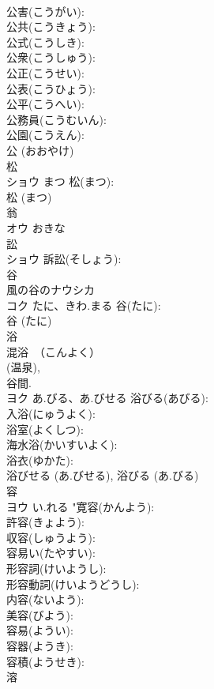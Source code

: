 \documentclass[8pt]{extreport}
\begin{document}
\begin{CJK}{UTF8}{min}
\\	公害(こうがい): 
\\	公共(こうきょう): 
\\	公式(こうしき): 
\\	公衆(こうしゅう): 
\\	公正(こうせい): 
\\	公表(こうひょう): 
\\	公平(こうへい): 
\\	公務員(こうむいん): 
\\	公園(こうえん): 
\\	公 (おおやけ)
\\	松			
\\	ショウ	まつ	松(まつ): 
\\	松 (まつ)
\\	翁			
\\	オウ	おきな		
\\	訟			
\\	ショウ		訴訟(そしょう): 
\\	谷			
\\	風の谷のナウシカ 
\\	コク	たに、きわ.まる	谷(たに): 
\\	谷 (たに)
\\	浴			
\\	混浴　（こんよく） 
\\	(温泉), 
\\	谷間.	
\\	ヨク	あ.びる、あ.びせる	浴びる(あびる): 
\\	入浴(にゅうよく): 
\\	浴室(よくしつ): 
\\	海水浴(かいすいよく): 
\\	浴衣(ゆかた): 
\\	浴びせる (あ.びせる), 浴びる (あ.びる)
\\	容			
\\	ヨウ	い.れる	"寛容(かんよう): 
\\	許容(きょよう): 
\\	収容(しゅうよう): 
\\	容易い(たやすい): 
\\	形容詞(けいようし): 
\\	形容動詞(けいようどうし): 
\\	内容(ないよう): 
\\	美容(びよう): 
\\	容易(ようい): 
\\	容器(ようき): 
\\	容積(ようせき): 
\\	溶			

\end{CJK}
\end{document}
